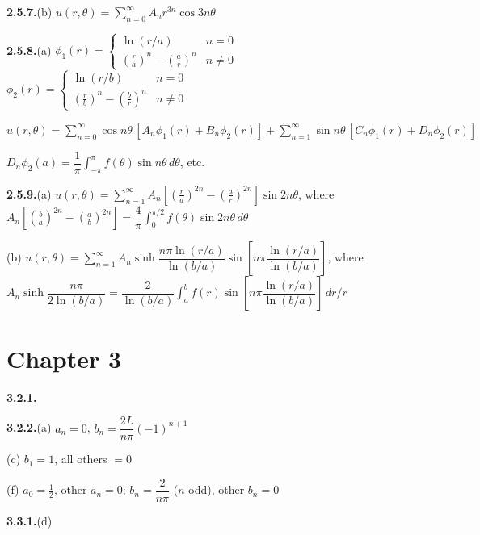 \medskip
\textbf{2.5.7.}\quad (b) $u(r,\theta) = \sum_{n=0}^{\infty} A_n r^{3n}\cos 3n\theta$

\medskip
\textbf{2.5.8.}\quad (a) $\phi_1(r) = \begin{cases} \ln(r/a) & n = 0 \\ \left(\frac{r}{a}\right)^n - \left(\frac{a}{r}\right)^n & n \neq 0 \end{cases}$\quad
$\phi_2(r) = \begin{cases} \ln(r/b) & n = 0 \\ \left(\frac{r}{b}\right)^n - \left(\frac{b}{r}\right)^n & n \neq 0 \end{cases}$

$u(r,\theta) = \sum_{n=0}^{\infty}\cos n\theta\,[A_n\phi_1(r)+B_n\phi_2(r)] + \sum_{n=1}^{\infty}\sin n\theta\,[C_n\phi_1(r)+D_n\phi_2(r)]$

$D_n\phi_2(a) = \dfrac{1}{\pi}\int_{-\pi}^{\pi}f(\theta)\sin n\theta\,d\theta$, etc.

\medskip
\textbf{2.5.9.}\quad (a) $u(r,\theta) = \sum_{n=1}^{\infty} A_n\left[\left(\frac{r}{a}\right)^{2n}-\left(\frac{a}{r}\right)^{2n}\right]\sin 2n\theta$, where $A_n\left[\left(\frac{b}{a}\right)^{2n}-\left(\frac{a}{b}\right)^{2n}\right] = \dfrac{4}{\pi}\int_0^{\pi/2}f(\theta)\sin 2n\theta\,d\theta$

\quad (b) $u(r,\theta) = \sum_{n=1}^{\infty} A_n\sinh\dfrac{n\pi\ln(r/a)}{\ln(b/a)}\sin\left[n\pi\dfrac{\ln(r/a)}{\ln(b/a)}\right]$, where $A_n\sinh\dfrac{n\pi}{2\ln(b/a)} = \dfrac{2}{\ln(b/a)}\int_a^b f(r)\sin\left[n\pi\dfrac{\ln(r/a)}{\ln(b/a)}\right]\,dr/r$%

\section*{Chapter 3}

\textbf{3.2.1.}\quad %

\medskip
\textbf{3.2.2.}\quad (a) $a_n = 0$, $b_n = \dfrac{2L}{n\pi}(-1)^{n+1}$

\quad (c) $b_1 = 1$, all others $= 0$

\quad (f) $a_0 = \frac{1}{2}$, other $a_n = 0$; $b_n = \dfrac{2}{n\pi}$ ($n$ odd), other $b_n = 0$

\medskip
\textbf{3.3.1.}\quad (d) %

